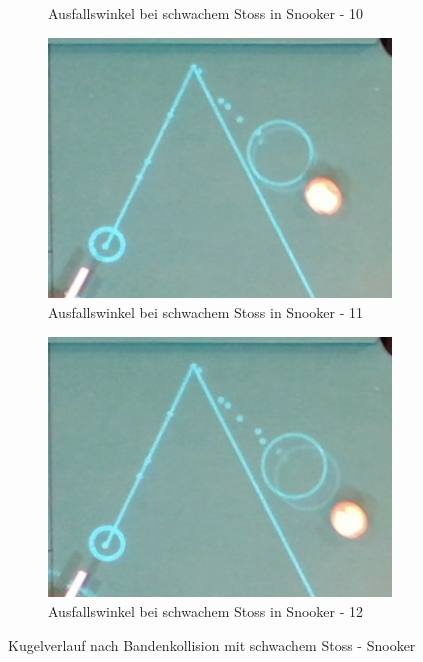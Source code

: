 \begin{figure}[h!]
\begin{subfigure}[b]{0.2\textwidth}
        \caption{Ausfallswinkel bei schwachem Stoss in Snooker - 10}
        \label{fig:rebound_angle_slow_snooker_10}
    \end{subfigure}
    \hfill
    \begin{subfigure}[b]{0.2\textwidth}
        \centering
        \includegraphics[width=1.0\linewidth]{../common/04_results/resources/simulation/rebound_angle_slow_snooker/00_rail_rebound_angle_slow_snooker_11.png}
        \caption{Ausfallswinkel bei schwachem Stoss in Snooker - 11}
        \label{fig:rebound_angle_slow_snooker_11}
    \end{subfigure}
    \hfill
    \begin{subfigure}[b]{0.2\textwidth}
        \centering
        \includegraphics[width=1.0\linewidth]{../common/04_results/resources/simulation/rebound_angle_slow_snooker/00_rail_rebound_angle_slow_snooker_12.png}
        \caption{Ausfallswinkel bei schwachem Stoss in Snooker - 12}
        \label{fig:rebound_angle_slow_snooker_12}
    \end{subfigure}
    \caption{Kugelverlauf nach Bandenkollision mit schwachem Stoss - Snooker}
    \label{fig:kugelverlauf_nach_bandenkollision_mit_schwachem_stoss_snooker}
\end{figure}

